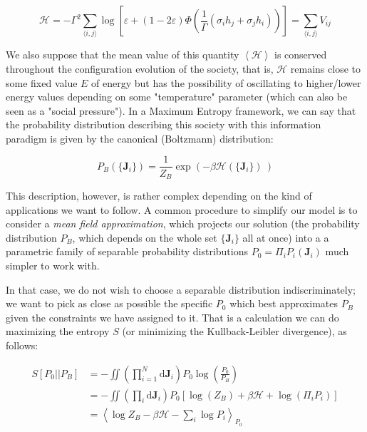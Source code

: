 \documentclass[12pt,a4paperpaper,]{tufte-book}
\begin{document}
\begin{equation}  \mathcal{H}=  - \Gamma^2 \sum_{\langle i,j \rangle} \log \left[ \varepsilon + \left(1 - 2\varepsilon\right) \Phi \left( \frac1\Gamma \left( \sigma_i h_j + \sigma_j h_i \right) \right) \right] = \sum_{\langle i,j \rangle} V_{ij} \label{eq:hamiltonian}\end{equation}

We also suppose that the mean value of this quantity \(\left\langle \mathcal{H} \right\rangle\) is conserved throughout the configuration evolution of the society, that is, \(\mathcal{H}\) remains close to some fixed value \(E\) of energy but has the possibility of oscillating to higher/lower energy values depending on some "temperature" parameter (which can also be seen as a "social pressure"). In a Maximum Entropy framework, we can say that the probability distribution describing this society with this information paradigm is given by the canonical (Boltzmann) distribution:

\[P_B(\{ \mathbf{J}_i \}) = \frac{1}{Z_B} \exp \left( - \beta \mathcal{H}\left( \{ \mathbf{J}_i \} \right)\ \right)\]

This description, however, is rather complex depending on the kind of applications we want to follow. A common procedure to simplify our model is to consider a \emph{mean field approximation}, which projects our solution (the probability distribution \(P_B\), which depends on the whole set \(\{\mathbf{J}_i\}\) all at once) into a a parametric family of separable probability distributions \(P_0 = \Pi_i P_i(\mathbf{J}_i)\) much simpler to work with.

In that case, we do not wish to choose a separable distribution indiscriminately; we want to pick as close as possible the specific \(P_0\) which best approximates \(P_B\) given the constraints we have assigned to it. That is a calculation we can do maximizing the entropy \(S\) (or minimizing the Kullback-Leibler divergence), as follows:

\begin{align}
      S[P_0 || P_B] &= - \iint \left( \prod_{i=1}^N \mathrm{d}\mathbf{J}_i \right) P_0 \log \left( \frac{P_0}{P_B} \right) \\
      &= - \iint \left( \prod_i \mathrm{d}\mathbf{J}_i \right) P_0 \left[ \log \left( Z_B \right) + \beta \mathcal{H}+ \log \left(\Pi_i P_i \right) \right] \\
     &= \left\langle \log Z_B  - \beta \mathcal{H}- \sum_i \log P_i \right\rangle_{P_0}
\end{align}
\end{document}
